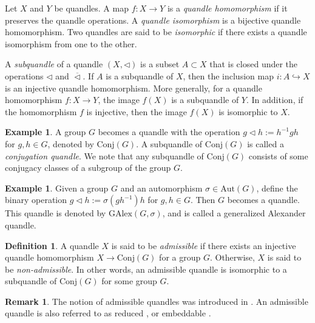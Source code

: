 \documentclass[12pt]{article}
\theoremstyle{plain}
\theoremstyle{definition}
\newtheorem{defn}[thm]{Definition}
\newtheorem{example}[thm]{Example}
\newtheorem{rem}[thm]{Remark}
\newcommand{\qop}{\triangleleft}
\begin{document}
Let $X$ and $Y$ be quandles.
A map $f: X \to Y$ is a \textit{quandle homomorphism}
if it preserves the quandle operations.
A \textit{quandle isomorphism} is a bijective quandle homomorphism.
Two quandles are said to be \textit{isomorphic} 
if there exists a quandle isomorphism from one to the other.

A \textit{subquandle} of a quandle $(X, \qop)$ is a subset $A \subset X$ that is closed under the operations $\qop$ and $\overline{\qop}$.
If $A$ is a subquandle of $X$, then the inclusion map $i: A \hookrightarrow X$ is an injective quandle homomorphism.
More generally, for a quandle homomorphism $f: X \to Y$, the image $f(X)$ is a subquandle of $Y$.
In addition, if the homomorphism $f$ is injective, then the image $f(X)$ is isomorphic to $X$.

\begin{example}\label{Ex:conjugation_quandle}
  A group $G$ becomes a quandle with the operation $g \qop h := h^{-1}gh$ for $g, h \in G$, denoted by $\mathrm{Conj}(G)$.
  A subquandle of $\mathrm{Conj}(G)$ is called a \textit{conjugation quandle}. We note that any subquandle of $\mathrm{Conj}(G)$ consists of some conjugacy classes of a subgroup of the group $G$.
\end{example}

\begin{example}\label{Ex:GAlex}
  Given a group $G$ and an automorphism $\sigma \in \mathrm{Aut}(G)$,
  define the binary operation $g \qop h := \sigma (g h^{-1}) h$ for $g, h \in G$.
  Then $G$ becomes a quandle.
  This quandle is denoted by $\mathrm{GAlex}(G, \sigma)$, and is called a generalized Alexander quandle.
\end{example}

\begin{defn}
  A quandle $X$ is said to be \textit{admissible} 
  if there exists an injective quandle homomorphism $X \to \mathrm{Conj}(G)$ for a group $G$.
  Otherwise, $X$ is said to be \textit{non-admissible}.
  In other words,
  an admissible quandle is isomorphic to a subquandle of $\mathrm{Conj}(G)$ for some group $G$.
\end{defn}

\begin{rem}
  The notion of admissible quandles 
  was introduced in \cite{Kamada-2005-EnvelopingMonoidalQuandles}. 
  An admissible quandle is also referred to as reduced \cite{Ryder-1996-AlgebraicConditionDetermineWhethera,Inoue-2010-KnotQuandlesInfiniteCyclica}, 
  or embeddable \cite{Akita-2023-EmbeddingAlexanderQuandlesGroupsa}.
\end{rem}
\end{document}
